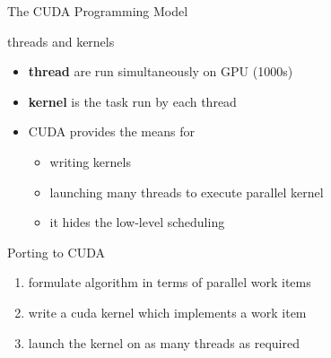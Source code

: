 \documentclass[aspectratio=43]{beamer}
\begin{document}
\begin{frame}[fragile]{The CUDA Programming Model}
    \begin{info}{threads and kernels}
        \begin{itemize}
            \item \textbf{thread} are run simultaneously on GPU (1000s)
            \item \textbf{kernel} is the task run by each thread
            \item CUDA provides the means for
            \begin{itemize}
                \item writing kernels
                \item launching many threads to execute parallel kernel
            \end{itemize}
            \begin{itemize}
                \item it hides the low-level scheduling
            \end{itemize}
        \end{itemize}
    \end{info}
    \begin{info}{Porting to CUDA}
        \begin{enumerate}
            \item formulate algorithm in terms of parallel work items
            \item write a cuda kernel which implements a work item
            \item launch the kernel on as many threads as required
        \end{enumerate}
    \end{info}

\end{frame}
\end{document}
